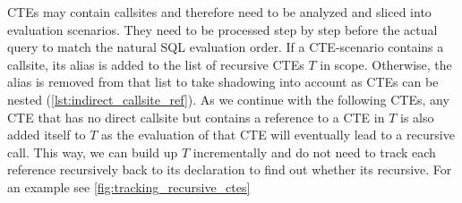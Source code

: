 CTEs may contain callsites and therefore need to be analyzed and sliced into evaluation scenarios. They need to be processed step by step before the actual query to match the natural SQL evaluation order. If a CTE-scenario contains a callsite, its alias is added to the list of recursive CTEs $T$ in scope. Otherwise, the alias is removed from that list to take shadowing into account as CTEs can be nested (\autoref{lst:indirect_callsite_ref}). As we continue with the following CTEs, any CTE that has no direct callsite but contains a reference to a CTE in $T$ is also added itself to $T$ as the evaluation of that CTE will eventually lead to a recursive call. This way, we can build up $T$ incrementally and do not need to track each reference recursively back to its declaration to find out whether its recursive. For an example see \autoref{fig:tracking_recursive_ctes}

